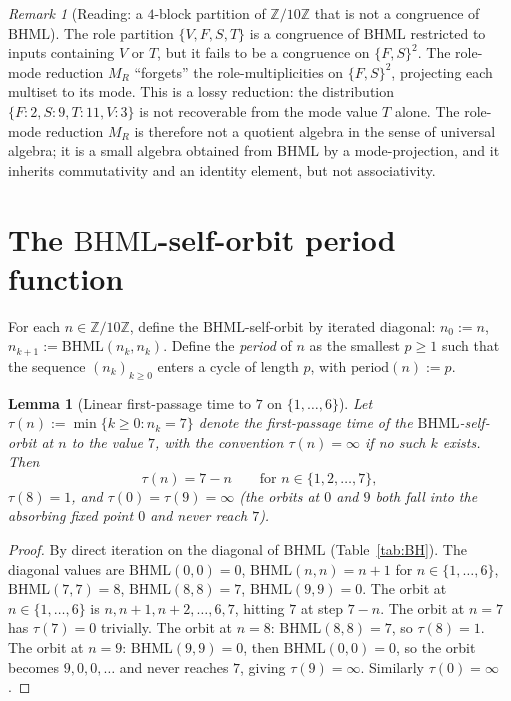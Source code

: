 \documentclass[11pt,reqno]{amsart}
\theoremstyle{plain}
\newtheorem{lemma}[theorem]{Lemma}
\theoremstyle{definition}
\theoremstyle{remark}
\newtheorem*{remark}{Remark}
\newcommand{\Z}{\mathbb{Z}}
\newcommand{\BH}{\mathrm{BHML}}
\newcommand{\Zten}{\Z/10\Z}
\begin{document}
\begin{remark}[Reading: a $4$-block partition of $\Zten$ that is
not a congruence of $\BH$]
The role partition $\{V, F, S, T\}$ is a congruence of $\BH$
restricted to inputs containing $V$ or $T$, but it fails to be a
congruence on $\{F, S\}^2$. The role-mode reduction $M_R$
``forgets'' the role-multiplicities on $\{F, S\}^2$, projecting
each multiset to its mode. This is a lossy reduction: the
distribution $\{F : 2, S : 9, T : 11, V : 3\}$ is not recoverable
from the mode value $T$ alone. The role-mode reduction $M_R$ is
therefore not a quotient algebra in the sense of universal
algebra; it is a small algebra obtained from $\BH$ by a
mode-projection, and it inherits commutativity and an identity
element, but not associativity.
\end{remark}

\section{The $\BH$-self-orbit period function}
\label{sec:periods}

For each $n \in \Zten$, define the $\BH$-self-orbit by iterated
diagonal: $n_0 := n$, $n_{k+1} := \BH(n_k, n_k)$. Define the
\emph{period} of $n$ as the smallest $p \ge 1$ such that the
sequence $(n_k)_{k \ge 0}$ enters a cycle of length $p$, with
$\mathrm{period}(n) := p$.

\begin{lemma}[Linear first-passage time to $7$ on
$\{1, \ldots, 6\}$]
\label{lem:bh-diagonal-period}
Let $\tau(n) := \min\{k \ge 0 : n_k = 7\}$ denote the
first-passage time of the $\BH$-self-orbit at $n$ to the value
$7$, with the convention $\tau(n) = \infty$ if no such $k$
exists. Then
\[
  \tau(n) = 7 - n \qquad \text{for } n \in \{1, 2, \ldots, 7\},
\]
$\tau(8) = 1$, and $\tau(0) = \tau(9) = \infty$ (the orbits at
$0$ and $9$ both fall into the absorbing fixed point $0$ and
never reach $7$).
\end{lemma}

\begin{proof}
By direct iteration on the diagonal of $\BH$ (Table~\ref{tab:BH}).
The diagonal values are $\BH(0, 0) = 0$, $\BH(n, n) = n + 1$ for
$n \in \{1, \ldots, 6\}$, $\BH(7, 7) = 8$, $\BH(8, 8) = 7$,
$\BH(9, 9) = 0$. The orbit at $n \in \{1, \ldots, 6\}$ is
$n, n + 1, n + 2, \ldots, 6, 7$, hitting $7$ at step $7 - n$.
The orbit at $n = 7$ has $\tau(7) = 0$ trivially. The orbit at
$n = 8$: $\BH(8, 8) = 7$, so $\tau(8) = 1$. The orbit at
$n = 9$: $\BH(9, 9) = 0$, then $\BH(0, 0) = 0$, so the
orbit becomes $9, 0, 0, \ldots$ and never reaches $7$, giving
$\tau(9) = \infty$. Similarly $\tau(0) = \infty$.
\end{proof}
\end{document}
